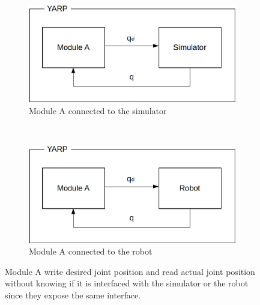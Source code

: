 \begin{figure}
        \centering
        \begin{subfigure}[b]{0.45\textwidth}
                \includegraphics[width=\textwidth]{images/yarp_simulation_a.eps}
                \caption{Module A connected to the simulator}
                \label{yarp_simulation_a}
        \end{subfigure}%
        \\
        \begin{subfigure}[b]{0.45\textwidth}
                \includegraphics[width=\textwidth]{images/yarp_simulation_b.eps}
                \caption{Module A connected to the robot}
                \label{yarp_simulation_b}
        \end{subfigure}
        \caption{Module A write desired joint position and read actual joint position without knowing if it is interfaced with the simulator or the robot since they expose the same interface.}\label{yarp_simulation}
\end{figure}

